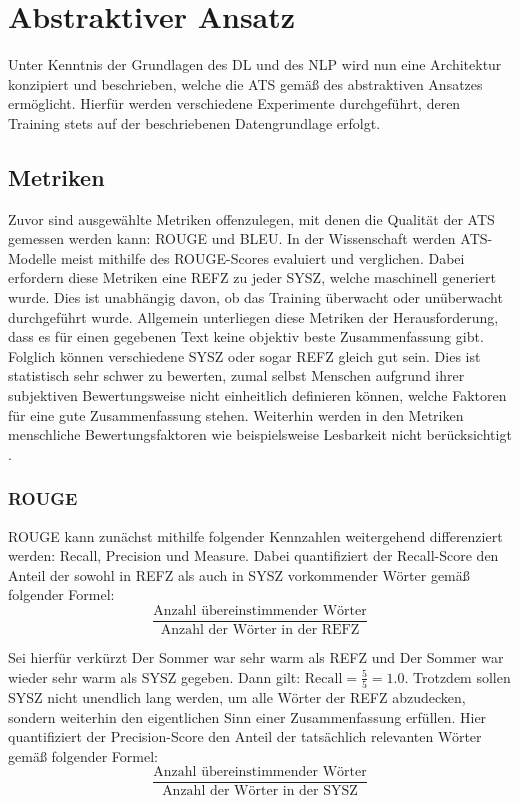 \chapter{Abstraktiver Ansatz}
\thispagestyle{fancy}
\label{chap:Abstraktiver Ansatz}

\noindent
Unter Kenntnis der Grundlagen des \ac{DL} und des \ac{NLP} wird nun eine Architektur konzipiert und beschrieben, welche die \ac{ATS} gemäß des abstraktiven Ansatzes ermöglicht. Hierfür werden verschiedene Experimente durchgeführt, deren Training stets auf der beschriebenen Datengrundlage erfolgt.\\


\section{Metriken}
\noindent
Zuvor sind ausgewählte Metriken offenzulegen, mit denen die Qualität der \ac{ATS} gemessen werden kann: \ac{ROUGE} und \ac{BLEU}. In der Wissenschaft werden \ac{ATS}-Modelle meist mithilfe des \ac{ROUGE}-Scores evaluiert und verglichen. Dabei erfordern diese Metriken eine \ac{REFZ} zu jeder \ac{SYSZ}, welche maschinell generiert wurde. Dies ist unabhängig davon, ob das Training überwacht oder unüberwacht durchgeführt wurde. Allgemein unterliegen diese Metriken der Herausforderung, dass es für einen gegebenen Text keine objektiv beste Zusammenfassung gibt. Folglich können verschiedene \ac{SYSZ} oder sogar \ac{REFZ} gleich gut sein. Dies ist statistisch sehr schwer zu bewerten, zumal selbst Menschen aufgrund ihrer subjektiven Bewertungsweise nicht einheitlich definieren können, welche Faktoren für eine gute Zusammenfassung stehen. Weiterhin werden in den Metriken menschliche Bewertungsfaktoren wie beispielsweise Lesbarkeit nicht berücksichtigt \cite{LEM20}.\\


\subsection{ROUGE}
\noindent
\ac{ROUGE} kann zunächst mithilfe folgender Kennzahlen weitergehend differenziert werden: Recall, Precision und Measure. Dabei quantifiziert der Recall-Score den Anteil der sowohl in \ac{REFZ} als auch in \ac{SYSZ} vorkommender Wörter gemäß folgender Formel:\\
$$\frac{\text{Anzahl übereinstimmender Wörter}}{\text{Anzahl der Wörter in der REFZ}}$$
\newpage

\noindent
Sei hierfür verkürzt \glqq Der Sommer war sehr warm\grqq{} als \ac{REFZ} und \glqq Der Sommer war wieder sehr warm\grqq{} als \ac{SYSZ} gegeben. Dann gilt: $\text{Recall} = \frac{5}{5} = 1.0$. Trotzdem sollen \ac{SYSZ} nicht unendlich lang werden, um alle Wörter der \ac{REFZ} abzudecken, sondern weiterhin den eigentlichen Sinn einer Zusammenfassung erfüllen. Hier quantifiziert der Precision-Score den Anteil der tatsächlich relevanten Wörter gemäß folgender Formel:\\
$$\frac{\text{Anzahl übereinstimmender Wörter}}{\text{Anzahl der Wörter in der SYSZ}}$$ \newline

